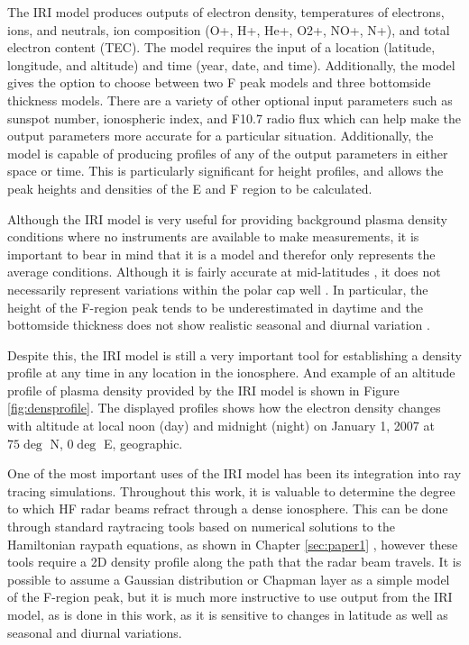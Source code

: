 The IRI model produces outputs of electron density, temperatures of electrons, ions, and neutrals, ion composition (O+, H+, He+, O2+, NO+, N+), and total electron content (TEC).  The model requires the input of a location (latitude, longitude, and altitude) and time (year, date, and time).  Additionally, the model gives the option to choose between two F peak models and three bottomside thickness models.  There are a variety of other optional input parameters such as sunspot number, ionospheric index, and F10.7 radio flux which can help make the output parameters more accurate for a particular situation.  Additionally, the model is capable of producing profiles of any of the output parameters in either space or time.  This is particularly significant for height profiles, and allows the peak heights and densities of the E and F region to be calculated.

Although the IRI model is very useful for providing background plasma density conditions where no instruments are available to make measurements, it is important to bear in mind that it is a model and therefor only represents the average conditions.  Although it is fairly accurate at mid-latitudes \citep{Coisson2006,Bilitza2012}, it does not necessarily represent variations within the polar cap well \citep{Themens2014,Makarevich2015}.  In particular, the height of the F-region peak tends to be underestimated in daytime and the bottomside thickness does not show realistic seasonal and diurnal variation \citep{Themens2014}.  

Despite this, the IRI model is still a very important tool for establishing a density profile at any time in any location in the ionosphere.  And example of an altitude profile of plasma density provided by the IRI model is shown in Figure \ref{fig:densprofile}.  The displayed profiles shows how the electron density changes with altitude at local noon (day) and midnight (night) on January 1, 2007 at \(75\deg\) N, \(0\deg\) E, geographic.

One of the most important uses of the IRI model has been its integration into ray tracing simulations.  Throughout this work, it is valuable to determine the degree to which HF radar beams refract through a dense ionosphere.  This can be done through standard raytracing tools based on numerical solutions to the Hamiltonian raypath equations, as shown in Chapter \ref{sec:paper1} \citep{Haselgrove1963,Jones1975}, however these tools require a 2D density profile along the path that the radar beam travels.  It is possible to assume a Gaussian distribution or Chapman layer as a simple model of the F-region peak, but it is much more instructive to use output from the IRI model, as is done in this work, as it is sensitive to changes in latitude as well as seasonal and diurnal variations.

